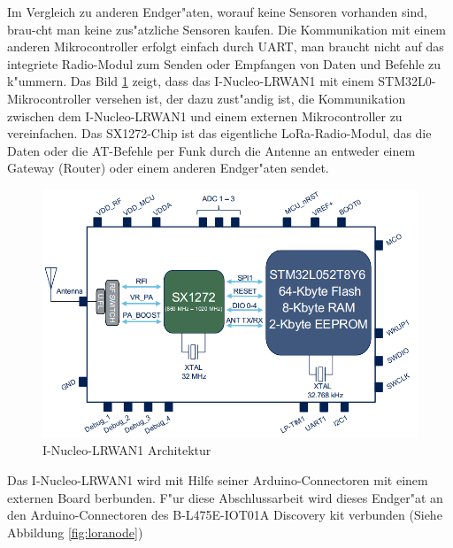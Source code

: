 Im Vergleich zu anderen Endger"aten, worauf keine Sensoren vorhanden 
sind, brau-cht man keine zus"atzliche Sensoren kaufen. Die 
Kommunikation mit einem anderen Mikrocontroller erfolgt einfach durch 
UART, man braucht nicht auf das integriete Radio-Modul zum Senden oder 
Empfangen von Daten und Befehle zu k"ummern. Das Bild 
\ref{fig:loraMod_intern} zeigt, dass das I-Nucleo-LRWAN1 mit einem 
STM32L0-Mikrocontroller versehen ist, der dazu zust"andig ist, die 
Kommunikation zwischen dem I-Nucleo-LRWAN1 und einem externen 
Mikrocontroller zu vereinfachen. Das SX1272-Chip ist das eigentliche 
LoRa-Radio-Modul, das die Daten oder die AT-Befehle per Funk durch die 
Antenne an entweder einem Gateway (Router) oder einem anderen 
Endger"aten sendet. 

\begin{figure}[h]
	\centering
	\includegraphics[width=14cm]{source/images/LoRa_Intern}
	\caption{I-Nucleo-LRWAN1 Architektur 
	\cite{LoRaMod}\label{fig:loraMod_intern}}
\end{figure}

\vspace{10cm}
Das I-Nucleo-LRWAN1 wird mit Hilfe seiner Arduino-Connectoren mit einem 
externen Board berbunden. F"ur diese Abschlussarbeit wird dieses 
Endger"at an den Arduino-Connectoren des B-L475E-IOT01A Discovery kit 
verbunden (Siehe Abbildung \ref{fig:loranode})

